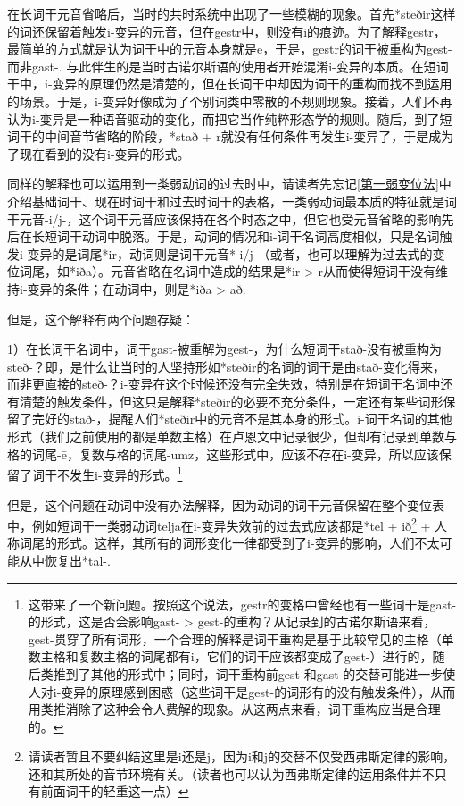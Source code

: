 {{在长词干元音省略后，当时的共时系统中出现了一些模糊的现象。首先*steðir这样的词还保留着触发i-变异的元音，但在gestr中，则没有i的痕迹。为了解释gestr，最简单的方式就是认为词干中的元音本身就是e，于是，gestr的词干被重构为gest-而非gast-.
与此伴生的是当时古诺尔斯语的使用者开始混淆i-变异的本质。在短词干中，i-变异的原理仍然是清楚的，但在长词干中却因为词干的重构而找不到运用的场景。于是，i-变异好像成为了个别词类中零散的不规则现象。接着，人们不再认为i-变异是一种语音驱动的变化，而把它当作纯粹形态学的规则。随后，到了短词干的中间音节省略的阶段，*stað
+ r就没有任何条件再发生i-变异了，于是成为了现在看到的没有i-变异的形式。

同样的解释也可以运用到一类弱动词的过去时中，请读者先忘记\ref{第一弱变位法}中介绍基础词干、现在时词干和过去时词干的表格，一类弱动词最本质的特征就是词干元音-i/j-，这个词干元音应该保持在各个时态之中，但它也受元音省略的影响先后在长短词干动词中脱落。于是，动词的情况和i-词干名词高度相似，只是名词触发i-变异的是词尾*ir，动词则是词干元音*-i/j-（或者，也可以理解为过去式的变位词尾，如*iða）。元音省略在名词中造成的结果是*ir
\textgreater{} r从而使得短词干没有维持i-变异的条件；在动词中，则是*iða
\textgreater{} að.

但是，这个解释有两个问题存疑：

1）在长词干名词中，词干gast-被重解为gest-，为什么短词干stað-没有被重构为steð-？即，是什么让当时的人坚持形如*steðir的名词的词干是由stað-变化得来，而非更直接的steð-？i-变异在这个时候还没有完全失效，特别是在短词干名词中还有清楚的触发条件，但这只是解释*steðir的必要不充分条件，一定还有某些词形保留了完好的stað-，提醒人们*steðir中的元音不是其本身的形式。i-词干名词的其他形式（我们之前使用的都是单数主格）在卢恩文中记录很少，但却有记录到单数与格的词尾-ē，复数与格的词尾-umz，这些形式中，应该不存在i-变异，所以应该保留了词干不发生i-变异的形式。\footnote{这带来了一个新问题。按照这个说法，gestr的变格中曾经也有一些词干是gast-的形式，这是否会影响gast-
  \textgreater{}
  gest-的重构？从记录到的古诺尔斯语来看，gest-贯穿了所有词形，一个合理的解释是词干重构是基于比较常见的主格（单数主格和复数主格的词尾都有i，它们的词干应该都变成了gest-）进行的，随后类推到了其他的形式中；同时，词干重构前gest-和gast-的交替可能进一步使人对i-变异的原理感到困惑（这些词干是gest-的词形有的没有触发条件），从而用类推消除了这种会令人费解的现象。从这两点来看，词干重构应当是合理的。}

但是，这个问题在动词中没有办法解释，因为动词的词干元音保留在整个变位表中，例如短词干一类弱动词telja在i-变异失效前的过去式应该都是*tel
+ ið\footnote{请读者暂且不要纠结这里是i还是j，因为i和j的交替不仅受西弗斯定律的影响，还和其所处的音节环境有关。（读者也可以认为西弗斯定律的运用条件并不只有前面词干的轻重这一点）}
+
人称词尾的形式。这样，其所有的词形变化一律都受到了i-变异的影响，人们不太可能从中恢复出*tal-.

}}
